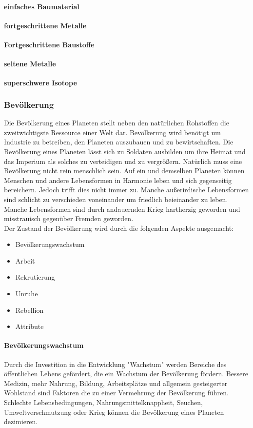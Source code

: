 \documentclass[11pt, a4paper]{article}
\begin{document}
\paragraph{einfaches Baumaterial}
%
\paragraph{fortgeschrittene Metalle}
%
\paragraph{Fortgeschrittene Baustoffe}
%
\paragraph{seltene Metalle}
%
\paragraph{superschwere Isotope}
%
\subsubsection{Bevölkerung}
Die Bevölkerung eines Planeten stellt neben den natürlichen Rohstoffen die zweitwichtigste Ressource einer Welt
dar. Bevölkerung wird benötigt um Industrie zu betreiben, den Planeten auszubauen und zu bewirtschaften.
Die Bevölkerung eines Planeten lässt sich zu Soldaten ausbilden um ihre Heimat und das Imperium als solches
zu verteidigen und zu vergrößern. Natürlich muss eine Bevölkerung nicht rein menschlich sein. Auf ein und
demselben Planeten können Menschen und andere Lebensformen in Harmonie leben und sich gegenseitig bereichern.
Jedoch trifft dies nicht immer zu. Manche außerirdische Lebensformen sind schlicht zu verschieden voneinander
um friedlich beieinander zu leben. Manche Lebensformen sind durch andauernden Krieg hartherzig geworden und
misstrauisch gegenüber Fremden geworden.\\
Der Zustand der Bevölkerung wird durch die folgenden Aspekte ausgemacht:
\begin{itemize}
    \item Bevölkerungswachstum
    \item Arbeit
    \item Rekrutierung
    \item Unruhe
    \item Rebellion
    \item Attribute
\end{itemize}
%
\paragraph{Bevölkerungswachstum}
Durch die Investition in die Entwicklung "Wachstum" werden Bereiche des öffentlichen Lebens gefördert, die
ein Wachstum der Bevölkerung fördern. Bessere Medizin, mehr Nahrung, Bildung, Arbeitsplätze und allgemein
gesteigerter Wohlstand sind Faktoren die zu einer Vermehrung der Bevölkerung führen.
Schlechte Lebensbedingungen, Nahrungsmittelknappheit, Seuchen, Umweltverschmutzung oder Krieg können die
Bevölkerung eines Planeten dezimieren.
%
\end{document}

